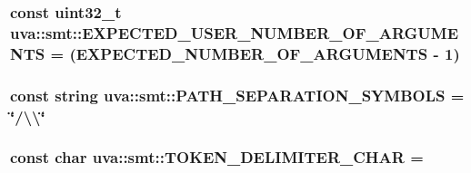 \subsubsection[{E\+X\+P\+E\+C\+T\+E\+D\+\_\+\+U\+S\+E\+R\+\_\+\+N\+U\+M\+B\+E\+R\+\_\+\+O\+F\+\_\+\+A\+R\+G\+U\+M\+E\+N\+T\+S}]{\setlength{\rightskip}{0pt plus 5cm}const uint32\+\_\+t uva\+::smt\+::\+E\+X\+P\+E\+C\+T\+E\+D\+\_\+\+U\+S\+E\+R\+\_\+\+N\+U\+M\+B\+E\+R\+\_\+\+O\+F\+\_\+\+A\+R\+G\+U\+M\+E\+N\+T\+S = ({\bf E\+X\+P\+E\+C\+T\+E\+D\+\_\+\+N\+U\+M\+B\+E\+R\+\_\+\+O\+F\+\_\+\+A\+R\+G\+U\+M\+E\+N\+T\+S} -\/ 1)}\label{namespaceuva_1_1smt_a290a86fa61cbe01b8f829f3162862b8f}
\hypertarget{namespaceuva_1_1smt_afb9a44bd9eb3ded951a6f0c41f07c108}{}
\subsubsection[{P\+A\+T\+H\+\_\+\+S\+E\+P\+A\+R\+A\+T\+I\+O\+N\+\_\+\+S\+Y\+M\+B\+O\+L\+S}]{\setlength{\rightskip}{0pt plus 5cm}const string uva\+::smt\+::\+P\+A\+T\+H\+\_\+\+S\+E\+P\+A\+R\+A\+T\+I\+O\+N\+\_\+\+S\+Y\+M\+B\+O\+L\+S = \char`\"{}/\textbackslash{}\textbackslash{}\char`\"{}}\label{namespaceuva_1_1smt_afb9a44bd9eb3ded951a6f0c41f07c108}
\hypertarget{namespaceuva_1_1smt_a83e439b9599a06adad4132cbfa40e4e3}{}
\subsubsection[{T\+O\+K\+E\+N\+\_\+\+D\+E\+L\+I\+M\+I\+T\+E\+R\+\_\+\+C\+H\+A\+R}]{\setlength{\rightskip}{0pt plus 5cm}const char uva\+::smt\+::\+T\+O\+K\+E\+N\+\_\+\+D\+E\+L\+I\+M\+I\+T\+E\+R\+\_\+\+C\+H\+A\+R = \textquotesingle{} \textquotesingle{}}\label{namespaceuva_1_1smt_a83e439b9599a06adad4132cbfa40e4e3}
